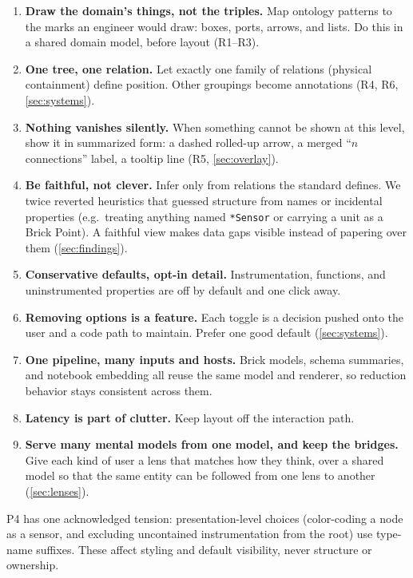 \documentclass[10pt,twocolumn]{article}
\begin{document}
\begin{enumerate}[label=\textbf{P\arabic*},leftmargin=*,itemsep=2pt]
  \item \textbf{Draw the domain's things, not the triples.} Map ontology patterns
  to the marks an engineer would draw: boxes, ports, arrows, and lists. Do this in
  a shared domain model, before layout (R1--R3).
  \item \textbf{One tree, one relation.} Let exactly one family of relations
  (physical containment) define position. Other groupings become annotations
  (R4, R6, \cref{sec:systems}).
  \item \textbf{Nothing vanishes silently.} When something cannot be shown at
  this level, show it in summarized form: a dashed rolled-up arrow, a merged
  ``$n$ connections'' label, a tooltip line (R5, \cref{sec:overlay}).
  \item \textbf{Be faithful, not clever.} Infer only from relations the standard
  defines. We twice reverted heuristics that guessed structure from names or
  incidental properties (e.g.\ treating anything named \texttt{*Sensor} or
  carrying a unit as a Brick Point). A faithful view makes data gaps visible
  instead of papering over them (\cref{sec:findings}).
  \item \textbf{Conservative defaults, opt-in detail.} Instrumentation, functions,
  and uninstrumented properties are off by default and one click away.
  \item \textbf{Removing options is a feature.} Each toggle is a decision pushed
  onto the user and a code path to maintain. Prefer one good default
  (\cref{sec:systems}).
  \item \textbf{One pipeline, many inputs and hosts.} Brick models, schema
  summaries, and notebook embedding all reuse the same model and renderer, so
  reduction behavior stays consistent across them.
  \item \textbf{Latency is part of clutter.} Keep layout off the interaction path.
  \item \textbf{Serve many mental models from one model, and keep the bridges.}
  Give each kind of user a lens that matches how they think, over a shared model
  so that the same entity can be followed from one lens to another
  (\cref{sec:lenses}).
\end{enumerate}

P4 has one acknowledged tension: presentation-level choices (color-coding a node
as a sensor, and excluding uncontained instrumentation from the root) use type-name
suffixes. These affect styling and default visibility, never structure or
ownership.
\end{document}
